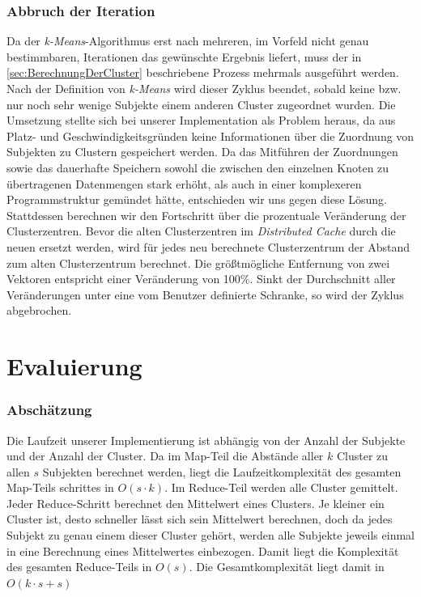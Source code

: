 \documentclass[a4paper]{llncs}
\begin{document}
\subsubsection{Abbruch der Iteration}
Da der \emph{k-Means}-Algorithmus erst nach mehreren, im Vorfeld nicht genau bestimmbaren, Iterationen das gewünschte Ergebnis liefert,
muss der in \ref{sec:BerechnungDerCluster} beschriebene Prozess mehrmals ausgeführt werden.
Nach der Definition von \emph{k-Means} wird dieser Zyklus beendet, sobald keine bzw. nur noch sehr wenige Subjekte einem anderen Cluster zugeordnet wurden.
Die Umsetzung stellte sich bei unserer Implementation als Problem heraus, da aus Platz- und Geschwindigkeitsgründen keine Informationen über die Zuordnung von Subjekten zu Clustern gespeichert werden. 
Da das Mitführen der Zuordnungen sowie das dauerhafte Speichern sowohl die zwischen den einzelnen Knoten zu übertragenen Datenmengen stark erhöht, als auch in einer komplexeren Programmstruktur gemündet hätte, entschieden wir uns gegen diese Lösung. 
Stattdessen berechnen wir den Fortschritt über die prozentuale Veränderung der Clusterzentren. Bevor die alten Clusterzentren im \emph{Distributed Cache} durch die neuen ersetzt werden, wird für jedes neu berechnete Clusterzentrum der Abstand zum alten Clusterzentrum berechnet.
Die größtmögliche Entfernung von zwei Vektoren entspricht einer Veränderung von 100\%. Sinkt der Durchschnitt aller Veränderungen unter eine vom Benutzer definierte Schranke, so wird der Zyklus abgebrochen.

\section{Evaluierung}

\subsubsection{Abschätzung}
Die Laufzeit unserer Implementierung ist abhängig von der Anzahl der Subjekte und der Anzahl der Cluster. Da im Map-Teil die Abstände aller $k$ Cluster zu allen $s$ Subjekten berechnet werden, liegt die Laufzeitkomplexität des gesamten Map-Teils schrittes in $O(s \cdot k)$. Im Reduce-Teil werden alle Cluster gemittelt. Jeder Reduce-Schritt berechnet den Mittelwert eines Clusters. Je kleiner ein Cluster ist, desto schneller lässt sich sein Mittelwert berechnen, doch da jedes Subjekt zu genau einem dieser Cluster gehört, werden alle Subjekte jeweils einmal in eine Berechnung eines Mittelwertes einbezogen. Damit liegt die Komplexität des gesamten Reduce-Teils in $O(s)$.
Die Gesamtkomplexität liegt damit in $O(k \cdot s + s)$
\end{document}
